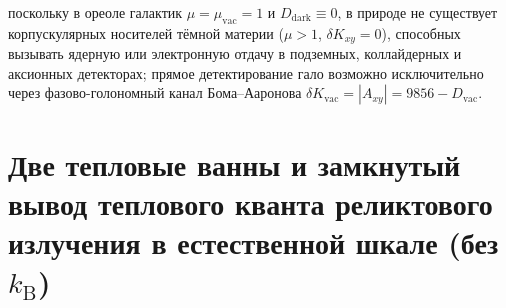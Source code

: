 \begin{theorem}[Запрет частиц «тёмной материи» $D_{\mathrm{dark}}\equiv 0$, вакуумно-голономная природа гало на полу $A_5$ и отношение $\Omega_{\mathrm{halo}}/\Omega_b = 16/3$]
\begin{enumerate}[leftmargin=*]
  поскольку в ореоле галактик $\mu = \mu_{\mathrm{vac}} = 1$ и $D_{\mathrm{dark}} \equiv 0$, в природе не существует корпускулярных носителей тёмной материи ($\mu > 1$, $\delta K_{xy} = 0$), способных вызывать ядерную или электронную отдачу в подземных, коллайдерных и аксионных детекторах; прямое детектирование гало возможно исключительно через фазово-голономный канал Бома--Ааронова $\delta K_{\mathrm{vac}} = |A_{xy}| = 9856 - D_{\mathrm{vac}}$.
\end{enumerate}
\end{theorem}

\section{Две тепловые ванны и замкнутый вывод теплового кванта реликтового излучения в естественной шкале (без \texorpdfstring{$k_{\mathrm{B}}$}{k\_B})}
\label{sec:cosmo-two-baths}

